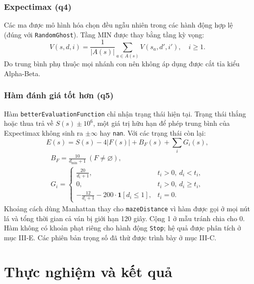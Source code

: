 \documentclass[conference]{IEEEtran}
\begin{document}
\subsubsection{Expectimax (q4)}
Các ma được mô hình hóa chọn đều ngẫu nhiên trong các hành động hợp lệ (đúng với \texttt{RandomGhost}). Tầng MIN được thay bằng tầng kỳ vọng:
\begin{equation}
V(s,d,i)=\frac{1}{|A(s)|}\sum_{a\in A(s)}V(s_a,d',i'),\quad i\ge 1.\label{eq:expectimax}
\end{equation}
Do trung bình phụ thuộc mọi nhánh con nên không áp dụng được cắt tỉa kiểu Alpha-Beta.

\subsubsection{Hàm đánh giá tốt hơn (q5)}
Hàm \texttt{betterEvaluationFunction} chỉ nhận trạng thái hiện tại. Trạng thái thắng hoặc thua trả về $S(s)\pm 10^{6}$, một giá trị hữu hạn để phép trung bình của Expectimax không sinh ra $\pm\infty$ hay \texttt{nan}. Với các trạng thái còn lại:
\begin{equation}
E(s)=S(s)-4|F(s)|+B_F(s)+\sum_i G_i(s),\label{eq:eval}
\end{equation}
\begin{gather*}
B_F = \frac{10}{d_{\min}+1}\ (F\neq\varnothing), \\
G_i = 
\begin{cases}
\frac{20}{d_i+1}, & t_i>0,\ d_i<t_i,\\
0, & t_i>0,\ d_i\ge t_i,\\
-\frac{12}{d_i+1}-200\cdot\mathbf{1}[d_i\le 1], & t_i=0.
\end{cases}
\end{gather*}
Khoảng cách dùng Manhattan thay cho \texttt{mazeDistance} vì hàm được gọi ở mọi nút lá và tổng thời gian cả ván bị giới hạn 120 giây. Cộng 1 ở mẫu tránh chia cho 0. Hàm không có khoản phạt riêng cho hành động \texttt{Stop}; hệ quả được phân tích ở mục III-E. Các phiên bản trọng số đã thử được trình bày ở mục III-C.

\section{Thực nghiệm và kết quả}
\end{document}
